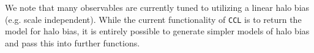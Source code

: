 \documentclass[\docopts]{\docclass}
\newcommand{\todo}[1]{\textcolor{magenta}{To do: #1}}
\newcommand{\vol}[1]{\textcolor{red}{Volunteer: #1}}
\begin{document}
We note that many observables are currently tuned to utilizing a linear halo bias (e.g. scale independent). While the current functionality of {\tt CCL} is to return the \citet{Tinker2010} model for halo bias, it is entirely possible to generate simpler models of halo bias and pass this into further functions.

\end{document}
